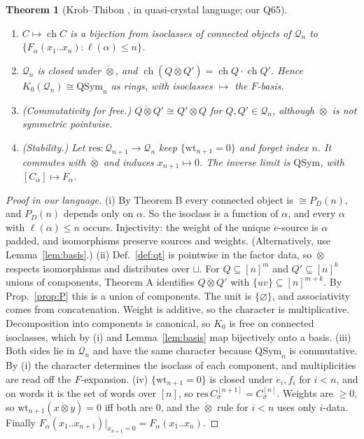 \documentclass[11pt]{amsart}
\newtheorem{theorem}{Theorem}[section]
\theoremstyle{definition}
\theoremstyle{remark}
\newcommand{\ee}{\ddot e}
\newcommand{\ff}{\ddot f}
\newcommand{\qt}{\mathbin{\ddot\otimes}}
\newcommand{\wt}{\mathrm{wt}}
\newcommand{\QSym}{\mathrm{QSym}}
\newcommand{\cQ}{\mathcal{Q}}
\begin{document}
\begin{theorem}[Krob--Thibon {\cite{KT4,KT5}}, in quasi-crystal language; our Q65]\label{thm:Q65}
\begin{enumerate}[label=(\roman*)]
\item $C\mapsto\operatorname{ch}C$ is a bijection from isoclasses of connected objects of $\cQ_n$ to $\{F_\alpha(x_1..x_n):\ell(\alpha)\le n\}$.
\item $\cQ_n$ is closed under $\qt$, and $\operatorname{ch}(Q\qt Q')=\operatorname{ch}Q\cdot\operatorname{ch}Q'$. Hence $K_0(\cQ_n)\cong\QSym_n$ as rings, with isoclasses $\mapsto$ the $F$-basis.
\item (Commutativity for free.) $Q\qt Q'\cong Q'\qt Q$ for $Q,Q'\in\cQ_n$, although $\qt$ is not symmetric pointwise.
\item (Stability.) Let $\mathrm{res}:\cQ_{n+1}\to\cQ_n$ keep $\{\wt_{n+1}=0\}$ and forget index $n$. It commutes with $\qt$ and induces $x_{n+1}\mapsto0$. The inverse limit is $\QSym$, with $[C_\alpha]\mapsto F_\alpha$.
\end{enumerate}
\end{theorem}
\begin{proof}[Proof in our language]
(i) By Theorem B every connected object is $\cong P_D(n)$, and $P_D(n)$ depends only on $\alpha$. So the isoclass is a function of $\alpha$, and every $\alpha$ with $\ell(\alpha)\le n$ occurs. Injectivity: the weight of the unique $\ee$-source is $\alpha$ padded, and isomorphisms preserve sources and weights. (Alternatively, use Lemma~\ref{lem:basis}.)
(ii) Def.~\ref{def:qt} is pointwise in the factor data, so $\qt$ respects isomorphisms and distributes over $\sqcup$. For $Q\subseteq[n]^m$ and $Q'\subseteq[n]^k$ unions of components, Theorem A identifies $Q\qt Q'$ with $\{uv\}\subseteq[n]^{m+k}$. By Prop.~\ref{prop:P} this is a union of components. The unit is $\{\varnothing\}$, and associativity comes from concatenation. Weight is additive, so the character is multiplicative. Decomposition into components is canonical, so $K_0$ is free on connected isoclasses, which by (i) and Lemma~\ref{lem:basis} map bijectively onto a basis.
(iii) Both sides lie in $\cQ_n$ and have the same character because $\QSym_n$ is commutative. By (i) the character determines the isoclass of each component, and multiplicities are read off the $F$-expansion.
(iv) $\{\wt_{n+1}=0\}$ is closed under $\ee_i,\ff_i$ for $i<n$, and on words it is the set of words over $[n]$, so $\mathrm{res}\,C^{[n+1]}_\sigma=C^{[n]}_\sigma$. Weights are $\ge0$, so $\wt_{n+1}(x\qt y)=0$ iff both are $0$, and the $\qt$ rule for $i<n$ uses only $i$-data. Finally $F_\alpha(x_1..x_{n+1})|_{x_{n+1}=0}=F_\alpha(x_1..x_n)$.
\end{proof}
\end{document}
